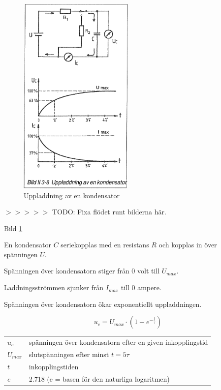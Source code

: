 \begin{figure}
\includegraphics[width=0.5\textwidth]{images/bild_2_3-08}
\caption{Uppladdning av en kondensator}
\label{fig:BildII3-08}
\end{figure}

$>>>>>$ TODO: Fixa flödet runt bilderna här.

Bild \ref{fig:BildII3-08}

En kondensator \(C\) seriekopplas med en resistans \(R\)
och kopplas in över spänningen \(U\).

Spänningen över kondensatorn stiger från 0 volt till \(U_{max}\).

Laddningsströmmen sjunker från \(I_{max}\) till 0 ampere.

Spänningen över kondensatorn ökar exponentiellt uppladdningen.

\[u_c = U_{max} \cdot ( 1 - e^{-\frac{t}{\tau}} )\]

\begin{tabular}{lp{}}
  \(u_c\)     & spänningen över kondensatorn efter en given inkopplingstid \\
  \(U_{max}\) & slutspänningen efter minst \(t = 5\tau\) \\
  \(t\)       & inkopplingstiden \\
  \(e\)       & 2.718 (e = basen för den naturliga logaritmen) \\
\end{tabular}

